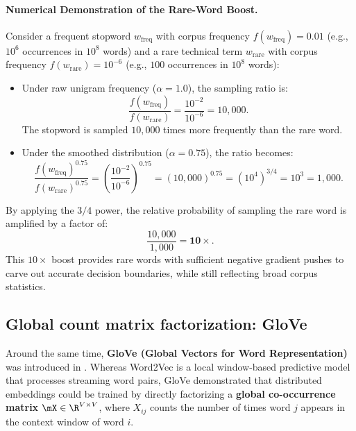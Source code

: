 \documentclass[../../main.tex]{subfiles}
\begin{document}
\paragraph{Numerical Demonstration of the Rare-Word Boost.}
Consider a frequent stopword $w_{\text{freq}}$ with corpus frequency $f(w_{\text{freq}}) = 0.01$ (e.g., $10^6$ occurrences in $10^8$ words) and a rare technical term $w_{\text{rare}}$ with corpus frequency $f(w_{\text{rare}}) = 10^{-6}$ (e.g., $100$ occurrences in $10^8$ words):
\begin{itemize}
    \item Under raw unigram frequency ($\alpha = 1.0$), the sampling ratio is:
    \begin{equation}
    \label{eq:ratio_raw}
    \frac{f(w_{\text{freq}})}{f(w_{\text{rare}})} = \frac{10^{-2}}{10^{-6}} = 10{,}000.
    \end{equation}
    The stopword is sampled $10{,}000$ times more frequently than the rare word.
    
    \item Under the smoothed distribution ($\alpha = 0.75$), the ratio becomes:
    \begin{equation}
    \label{eq:ratio_smoothed}
    \frac{f(w_{\text{freq}})^{0.75}}{f(w_{\text{rare}})^{0.75}} = \left( \frac{10^{-2}}{10^{-6}} \right)^{0.75} = (10{,}000)^{0.75} = (10^4)^{3/4} = 10^3 = 1{,}000.
    \end{equation}
\end{itemize}
By applying the $3/4$ power, the relative probability of sampling the rare word is amplified by a factor of:
\begin{equation}
\label{eq:boost_factor}
\frac{10{,}000}{1{,}000} = \mathbf{10\times}.
\end{equation}
This $10\times$ boost provides rare words with sufficient negative gradient pushes to carve out accurate decision boundaries, while still reflecting broad corpus statistics.

\subsection{Global count matrix factorization: GloVe}
\label{subsec:glove_comparison}

Around the same time, \textbf{GloVe (Global Vectors for Word Representation)} was introduced in \cite{pennington2014glove}. Whereas Word2Vec is a local window-based predictive model that processes streaming word pairs, GloVe demonstrated that distributed embeddings could be trained by directly factorizing a \textbf{global co-occurrence matrix} $\mX \in \R^{V \times V}$, where $X_{ij}$ counts the number of times word $j$ appears in the context window of word $i$.
\end{document}
